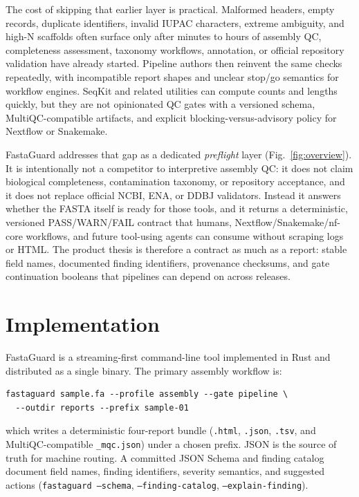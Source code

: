 \documentclass[11pt,a4paper]{article}
\begin{document}
The cost of skipping that earlier layer is practical.
Malformed headers, empty records, duplicate identifiers, invalid IUPAC
characters, extreme ambiguity, and high-N scaffolds often surface only after
minutes to hours of assembly QC, completeness assessment, taxonomy workflows,
annotation, or official repository validation have already started.
Pipeline authors then reinvent the same checks repeatedly, with incompatible
report shapes and unclear stop/go semantics for workflow engines.
SeqKit and related utilities can compute counts and lengths quickly, but they
are not opinionated QC gates with a versioned schema, MultiQC-compatible
artifacts, and explicit blocking-versus-advisory policy for Nextflow or
Snakemake.

FastaGuard addresses that gap as a dedicated \emph{preflight} layer
(Fig.~\ref{fig:overview}).
It is intentionally not a competitor to interpretive assembly QC:
it does not claim biological completeness, contamination taxonomy, or repository
acceptance, and it does not replace official NCBI, ENA, or DDBJ validators.
Instead it answers whether the FASTA itself is ready for those tools, and it
returns a deterministic, versioned PASS/WARN/FAIL contract that humans,
Nextflow/Snakemake/nf-core workflows, and future tool-using agents can consume
without scraping logs or HTML.
The product thesis is therefore a contract as much as a report:
stable field names, documented finding identifiers, provenance checksums, and
gate continuation booleans that pipelines can depend on across releases.

\section{Implementation}
FastaGuard is a streaming-first command-line tool implemented in Rust and
distributed as a single binary.
The primary assembly workflow is:

\begin{verbatim}
fastaguard sample.fa --profile assembly --gate pipeline \
  --outdir reports --prefix sample-01
\end{verbatim}

\noindent
which writes a deterministic four-report bundle
(\texttt{.html}, \texttt{.json}, \texttt{.tsv}, and MultiQC-compatible
\texttt{\_mqc.json}) under a chosen prefix.
JSON is the source of truth for machine routing.
A committed JSON Schema and finding catalog document field names, finding
identifiers, severity semantics, and suggested actions
(\texttt{fastaguard --schema}, \texttt{--finding-catalog},
\texttt{--explain-finding}).
\end{document}

